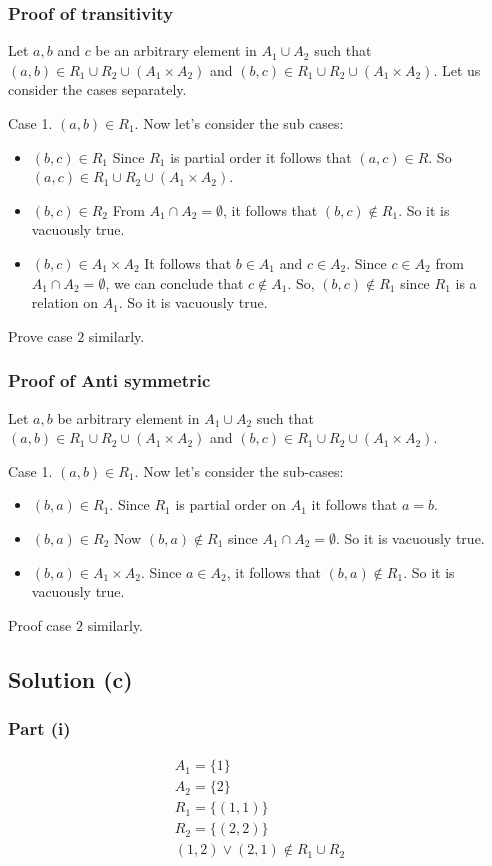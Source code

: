 \documentclass{article}
\begin{document}
\subsubsection{Proof of transitivity}
Let $a,b$ and $c$ be an arbitrary element in $A_1 \cup A_2$ such that
$(a,b) \in R_1 \cup R_2 \cup (A_1 \times A_2)$ and $(b,c) \in R_1 \cup
R_2 \cup (A_1 \times A_2)$. Let us consider the cases separately.

Case 1. $(a,b) \in R_1$. Now let's consider the sub cases:
\begin{itemize}
\item $(b,c) \in R_1$ Since $R_1$ is partial order it follows that
  $(a,c) \in R$. So $(a,c) \in R_1 \cup R_2 \cup (A_1 \times A_2)$.
\item $(b,c) \in R_2$ From $A_1 \cap A_2 = \emptyset$, it follows that
  $(b,c) \notin R_1$. So it is vacuously true.
\item $(b,c)\in A_1 \times A_2$ It follows that $b \in A_1$ and $c \in
  A_2$. Since $c \in A_2$ from $A_1 \cap A_2 = \emptyset$, we can
  conclude that $c \notin A_1$. So, $(b,c) \notin R_1$ since $R_1$ is
  a relation on $A_1$. So it is vacuously true.
\end{itemize}
Prove case $2$ similarly.

\subsubsection{Proof of Anti symmetric}
Let $a,b$ be arbitrary element in $A_1 \cup A_2$ such that $(a,b) \in
R_1 \cup R_2 \cup (A_1 \times A_2)$ and $(b,c) \in R_1 \cup R_2 \cup
(A_1 \times A_2)$.

Case 1. $(a,b) \in R_1$. Now let's consider the sub-cases:
\begin{itemize}
\item $(b,a) \in R_1$. Since $R_1$ is partial order on $A_1$ it
  follows that $a = b$.
\item $(b,a) \in R_2$ Now $(b,a) \notin R_1$ since $A_1 \cap A_2 =
  \emptyset$. So it is vacuously true.
\item $(b,a) \in A_1 \times A_2$. Since $a \in A_2$, it follows that
  $(b,a) \notin R_1$. So it is vacuously true.
\end{itemize}
Proof case $2$ similarly.

\subsection{Solution (c)}
\subsubsection{Part (i)}
\begin{align*}
  A_1 = \{1\} \\
  A_2 = \{2\} \\
  R_1 = \{(1,1)\} \\
  R_2 = \{(2,2)\} \\
  (1,2) \lor (2,1) \notin R_1 \cup R_2
\end{align*}
\end{document}
